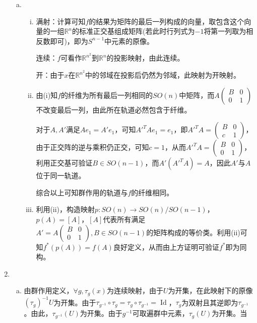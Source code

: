 \documentclass[a4paper,UTF8,fontset=windows]{ctexart}
\DeclareMathOperator{\Id}{Id}
\begin{document}
\begin{enumerate}[(1)]
\begin{enumerate}[(a)]
    \item
    \begin{enumerate}[(i)]
    \item
    满射：计算可知$f$的结果为矩阵的最后一列构成的向量，取包含这个向量的一组$\mathbb{R}^n$的标准正交基组成矩阵(若此时行列式为$-1$将第一列取为相反数即可)，即为$S^{n-1}$中元素的原像。
    
    连续：$f$可看作$\mathbb{R}^{n^2}$到$\mathbb{R}^n$的投影映射，由此连续。
    
    开：由于$x$在$\mathbb{R}^{n^2}$中的邻域在投影后仍然为邻域，此映射为开映射。
    
    \item
    由(i)知$f$的纤维为所有最后一列相同的$SO(n)$中矩阵，而$A\begin{pmatrix}B&0\\0&1\end{pmatrix}$不改变最后一列，由此所在轨道必然包含于纤维。
    
    对于$A,A'$满足$Ae_1=A'e_1$，可知$A'^TAe_1=e_1$，即$A'^TA=\begin{pmatrix}B&0\\c&1\end{pmatrix}$，由于正交阵的逆与乘积仍正交，可知$c=1$，从而$A'^TA=\begin{pmatrix}B&0\\0&1\end{pmatrix}$，利用正交基可验证$B\in SO(n-1)$，而$A'(A'^TA)=A$，因此$A'$与$A$位于同一轨道。
    
    综合以上可知群作用的轨道与$f$的纤维相同。
    
    \item
    利用(ii)，构造映射$p:SO(n)\to SO(n)/SO(n-1)$，$p(A)=[A]$，$[A]$代表所有满足$A'=A\begin{pmatrix}B&0\\0&1\end{pmatrix},B\in SO(n-1)$的矩阵构成的等价类。利用(ii)可知$f^*(p(A))=f(A)$良好定义，从而由上方证明可验证$f^*$即为同构。
    \end{enumerate}
    \end{enumerate}
    
    \item
    \begin{enumerate}[(a)]
    \item
    由群作用定义，$\forall g,\tau_g(x)$为连续映射，由于$U$为开集，在此映射下的原像$(\tau_g)^{-1}U$为开集。由于$\tau_{g^{-1}}\circ\tau_g=\tau_g\circ\tau_{g^{-1}}=\Id$，$\tau_g$为双射且其逆即为$\tau_{g^{-1}}$。由此，$\tau_{g^{-1}}(U)$为开集。由于$g^{-1}$可取遍群中元素，$\tau_g(U)$为开集。当
    

\end{enumerate}
\end{enumerate}
\end{document}
